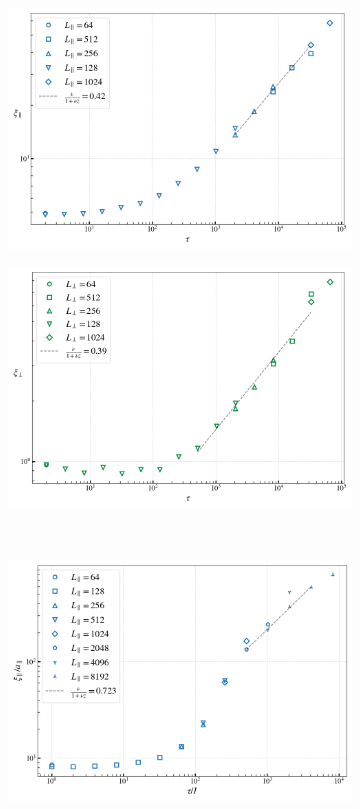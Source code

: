 	\begin{figure}
		\begin{subfigure}{0.475\textwidth}
			\centering		\includegraphics[width=0.97\linewidth]{graphics/tau-xi-parallel-large-eta.png}
		\end{subfigure}
		\begin{subfigure}{0.475\textwidth}
			\centering		\includegraphics[width=0.97\linewidth]{graphics/tau-xi-perp-large-eta.png}
		\end{subfigure} \\ \par\bigskip
		\begin{subfigure}{0.475\textwidth}
			\centering
			\includegraphics[width=0.97\linewidth]{graphics/tau-xi-parallel-small-eta-2.png}

\end{subfigure}
\end{figure}
